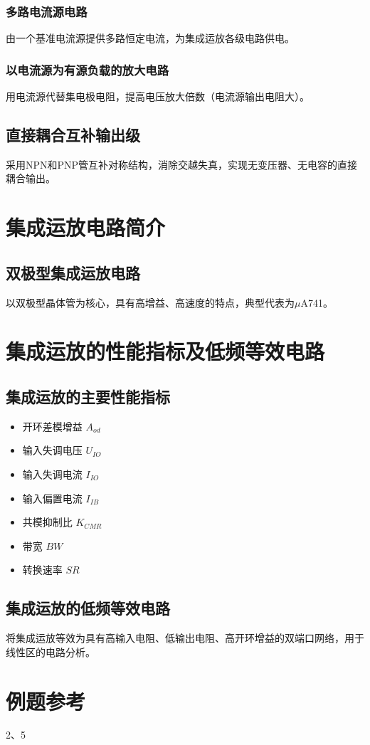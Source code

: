 \subsubsection{多路电流源电路}
由一个基准电流源提供多路恒定电流，为集成运放各级电路供电。

\subsubsection{以电流源为有源负载的放大电路}
用电流源代替集电极电阻，提高电压放大倍数（电流源输出电阻大）。

\subsection{直接耦合互补输出级}
采用NPN和PNP管互补对称结构，消除交越失真，实现无变压器、无电容的直接耦合输出。

\section{集成运放电路简介}
\subsection{双极型集成运放电路}
以双极型晶体管为核心，具有高增益、高速度的特点，典型代表为$\mu$A741。

\section{集成运放的性能指标及低频等效电路}
\subsection{集成运放的主要性能指标}
\begin{itemize}
    \item 开环差模增益 $A_{od}$
    \item 输入失调电压 $U_{IO}$
    \item 输入失调电流 $I_{IO}$
    \item 输入偏置电流 $I_{IB}$
    \item 共模抑制比 $K_{CMR}$
    \item 带宽 $BW$
    \item 转换速率 $SR$
\end{itemize}

\subsection{集成运放的低频等效电路}
将集成运放等效为具有高输入电阻、低输出电阻、高开环增益的双端口网络，用于线性区的电路分析。

\section{例题参考}
2、5